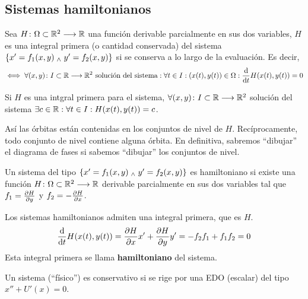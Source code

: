 
\subsection{Sistemas hamiltonianos}

\begin{defn}
	Sea $H \colon \Omega\subset \mathbb{R}^2 \longrightarrow \mathbb{R}$ una función derivable parcialmente en sus dos variables, $H$ es una integral primera (o cantidad conservada) del sistema $\{x' = f_1(x, y) \; _{\wedge} \; y'=f_2(x, y)\}$ si se conserva a lo largo de la evaluación. Es decir,
	\[\iff \forall \appl{(x, y)}{I\subset\R}{\R^2}\tex{ solución del sistema} : \forall t\in I : (x(t), y(t)) \in \Omega : \odv{}{t} H(x(t), y(t)) = 0\]
\end{defn}

\begin{obs}
	Si $H$ es una intgral primera para el sistema, $\forall (x, y) \colon I\subset\mathbb{R} \longrightarrow \mathbb{R}^2$ solución del sistema $\exists c\in\mathbb{R} : \forall t\in I : H(x(t), y(t)) = c$.

	Así las órbitas están contenidas en los conjuntos de nivel de $H$. Recíprocamente, todo conjunto de nivel contiene alguna órbita. En definitiva, sabremos ``dibujar'' el diagrama de fases si sabemos ``dibujar'' los conjuntos de nivel.
\end{obs}

\begin{defn}
	Un sistema del tipo $\{x' = f_1(x, y) \; _{\wedge} \; y'=f_2(x, y)\}$ es hamiltoniano si existe una función $H \colon \Omega\subset \mathbb{R}^2 \longrightarrow \mathbb{R}$ derivable parcialmente en sus dos variables tal que $f_1 = \pdv{H}{y}$ y $f_2 = -\pdv{H}{x}$.
\end{defn}

\begin{obs}
	Los sistemas hamiltonianos admiten una integral primera, que es $H$.
	\[\odv{}{t} H(x(t), y(t)) = \pdv{H}{x} x' + \pdv{H}{y} y' = -f_2 f_1 + f_1 f_2 = 0\]
	Esta integral primera se llama \textbf{hamiltoniano} del sistema.
\end{obs}

\begin{defn}
	Un sistema (``físico'') es conservativo si se rige por una EDO (escalar) del tipo $x'' + U'(x) = 0$.
\end{defn}

